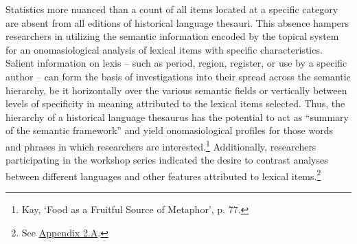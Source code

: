 Statistics more nuanced than a count of all items located at a specific category are absent from all editions of historical language thesauri. This absence hampers researchers in utilizing the semantic information encoded by the topical system for an onomasiological analysis of lexical items with specific characteristics. Salient information on lexis -- such as period, region, register, or use by a specific author -- can form the basis of investigations into their spread across the semantic hierarchy, be it horizontally over the various semantic fields or vertically between levels of specificity in meaning attributed to the lexical items selected. Thus, the hierarchy of a historical language thesaurus has the potential to act as ``summary of the semantic framework'' and yield onomasiological profiles for those words and phrases in which researchers are interested.\footnote{Kay, `Food as a Fruitful Source of Metaphor', p. 77.} Additionally, researchers participating in the workshop series indicated the desire to contrast analyses between different languages and other features attributed to lexical items.\footnote{See \hyperref[Appendix2.A]{Appendix 2.A}.}



